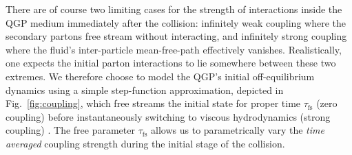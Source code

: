 \documentclass[aps,prc,reprint,amsmath,nofootinbib]{revtex4-1}
\newcommand{\taufs}{\tau_\text{fs}}
\begin{document}
There are of course two limiting cases for the strength of interactions inside the QGP medium immediately after the collision: infinitely weak coupling where the secondary partons free stream without interacting, and infinitely strong coupling where the fluid's inter-particle mean-free-path effectively vanishes.
Realistically, one expects the initial parton interactions to lie somewhere between these two extremes.
We therefore choose to model the QGP's initial off-equilibrium dynamics using a simple step-function approximation, depicted in Fig.~\ref{fig:coupling}, which free streams the initial state for proper time $\taufs$ (zero coupling) before instantaneously switching to viscous hydrodynamics (strong coupling) \cite{Liu:2015nwa, Broniowski:2008qk}.
The free parameter $\taufs$ allows us to parametrically vary the \emph{time averaged} coupling strength during the initial stage of the collision.
\end{document}
